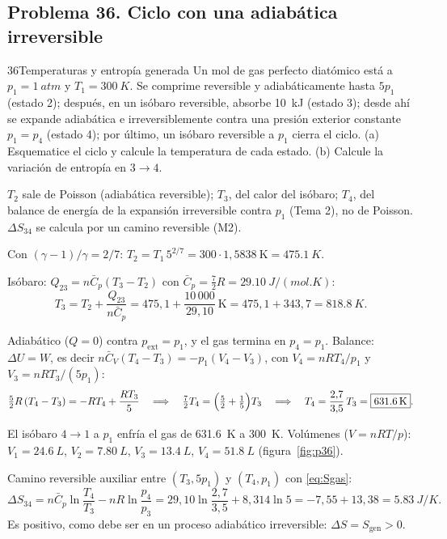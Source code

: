 \subsection{Problema 36. Ciclo con una adiabática irreversible}
\begin{problema}{36}{Temperaturas y entropía generada}
Un mol de gas perfecto diatómico está a $p_1=\SI{1}{atm}$ y $T_1=\SI{300}{K}$. Se comprime reversible y
adiabáticamente hasta $5p_1$ (estado 2); después, en un isóbaro reversible, absorbe \SI{10}{kJ} (estado 3); desde ahí
se expande adiabática e irreversiblemente contra una presión exterior constante $p_1=p_4$ (estado 4); por último,
un isóbaro reversible a $p_1$ cierra el ciclo. (a) Esquematice el ciclo y calcule la temperatura de cada estado.
(b) Calcule la variación de entropía en $3\to4$.
\end{problema}

\begin{resolucion}
\idea $T_2$ sale de Poisson (adiabática reversible); $T_3$, del calor del isóbaro; $T_4$, del balance de energía de la
expansión irreversible contra $p_1$ (Tema 2), no de Poisson. $\Delta S_{34}$ se calcula por un camino reversible
(M2).

 Con $(\gamma-1)/\gamma=2/7$:
$T_2=T_1\,5^{2/7}=300\cdot1{,}5838\ \mathrm K=\boxed{\SI{475,1}{K}}$.

 Isóbaro: $Q_{23}=n\bar C_p(T_3-T_2)$ con $\bar C_p=\tfrac72R=\SI{29,10}{J/(mol.K)}$:
\[
  T_3=T_2+\frac{Q_{23}}{n\bar C_p}=475{,}1+\frac{10\,000}{29{,}10}\ \mathrm K=475{,}1+343{,}7=\boxed{\SI{818,8}{K}}.
\]

 Adiabático ($Q=0$) contra $p_{\mathrm{ext}}=p_1$, y el gas termina en $p_4=p_1$. Balance:
$\Delta U=W$, es decir $n\bar C_V(T_4-T_3)=-p_1(V_4-V_3)$, con $V_4=nRT_4/p_1$ y $V_3=nRT_3/(5p_1)$:
\[
  \tfrac52R\,(T_4-T_3)=-RT_4+\frac{RT_3}{5}
  \quad\Longrightarrow\quad
  \tfrac72T_4=\Bigl(\tfrac52+\tfrac15\Bigr)T_3
  \quad\Longrightarrow\quad
  T_4=\frac{2{,}7}{3{,}5}\,T_3=\boxed{\SI{631,6}{K}}.
\]

 El isóbaro $4\to1$ a $p_1$ enfría el gas de \SI{631,6}{K} a \SI{300}{K}. Volúmenes
($V=nRT/p$): $V_1=\SI{24,6}{L}$, $V_2=\SI{7,80}{L}$, $V_3=\SI{13,4}{L}$, $V_4=\SI{51,8}{L}$ (figura~\ref{fig:p36}).

 Camino reversible auxiliar entre $(T_3,5p_1)$ y $(T_4,p_1)$ con \eqref{eq:Sgas}:
\[
  \Delta S_{34}=n\bar C_p\ln\frac{T_4}{T_3}-nR\ln\frac{p_4}{p_3}
  =29{,}10\ln\frac{2{,}7}{3{,}5}+8{,}314\ln5
  =-7{,}55+13{,}38=\boxed{\SI{5,83}{J/K}}.
\]
Es positivo, como debe ser en un proceso adiabático irreversible: $\Delta S=S_{\mathrm{gen}}>0$.
\end{resolucion}

